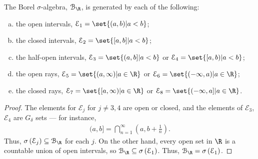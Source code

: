 \documentclass[10pt]{mypackage}
\begin{document}
\begin{proposition}[Proposition 1.2]
  The Borel $\sigma$-algebra, $\mathcal{B}_{\R}$, is generated by each of the following:
  \begin{enumerate}[(a)]
    \item the open intervals, $\mathcal{E}_1 = \set{(a,b) | a < b}$;
    \item the closed intervals, $\mathcal{E}_2 = \set{[a,b] | a < b}$;
    \item the half-open intervals, $\mathcal{E}_3 = \set{(a,b] | a < b}$ or $\mathcal{E}_4 = \set{[a,b) | a < b}$;
    \item the open rays, $\mathcal{E}_5 = \set{(a,\infty) | a \in \R}$ or $\mathcal{E}_6 = \set{(-\infty,a) | a\in\R}$;
    \item the closed rays, $\mathcal{E}_7 = \set{[a,\infty) | a\in\R}$ or $\mathcal{E}_8 = \set{(-\infty,a] | a\in\R}$.
  \end{enumerate}
\end{proposition}
\begin{proof}
  The elements for $\mathcal{E}_j$ for $j\neq 3,4$ are open or closed, and the elements of $\mathcal{E}_3$, $\mathcal{E}_4$ are $G_{\delta}$ sets --- for instance,
  \begin{align*}
    (a,b] = \bigcap_{n=1}^{\infty}\left(a,b + \frac{1}{n}\right).
  \end{align*}
  Thus, $\sigma\left(\mathcal{E}_j\right)\subseteq \mathcal{B}_{\R}$ for each $j$. On the other hand, every open set in $\R$ is a countable union of open intervals, so $\mathcal{B}_{\R}\subseteq \sigma\left(\mathcal{E}_1\right)$. Thus, $\mathcal{B}_{\R} = \sigma\left(\mathcal{E}_1\right)$.
\end{proof}
\end{document}
